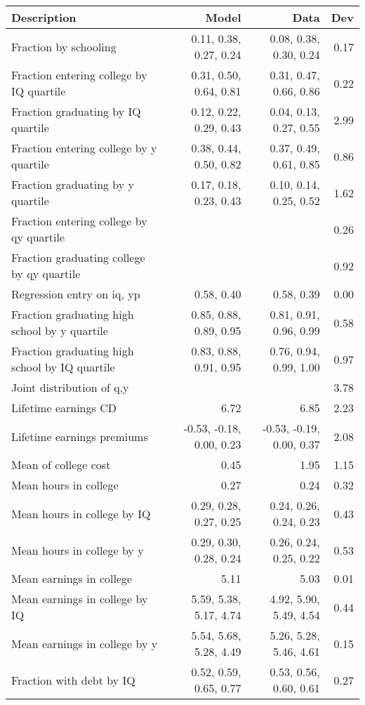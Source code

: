 \begin{tabular}{lrrr}
\hline
Description & Model  & Data  & Dev  \\ 
\hline
Fraction by schooling & 0.11, 0.38, 0.27, 0.24  & 0.08, 0.38, 0.30, 0.24  & 0.17  \\ 
Fraction entering college by IQ quartile & 0.31, 0.50, 0.64, 0.81  & 0.31, 0.47, 0.66, 0.86  & 0.22  \\ 
Fraction graduating by IQ quartile & 0.12, 0.22, 0.29, 0.43  & 0.04, 0.13, 0.27, 0.55  & 2.99  \\ 
Fraction entering college by y quartile & 0.38, 0.44, 0.50, 0.82  & 0.37, 0.49, 0.61, 0.85  & 0.86  \\ 
Fraction graduating by y quartile & 0.17, 0.18, 0.23, 0.43  & 0.10, 0.14, 0.25, 0.52  & 1.62  \\ 
Fraction entering college by qy quartile &   &   & 0.26  \\ 
Fraction graduating college by qy quartile &   &   & 0.92  \\ 
Regression entry on iq, yp & 0.58, 0.40  & 0.58, 0.39  & 0.00  \\ 
Fraction graduating high school by y quartile & 0.85, 0.88, 0.89, 0.95  & 0.81, 0.91, 0.96, 0.99  & 0.58  \\ 
Fraction graduating high school by IQ quartile & 0.83, 0.88, 0.91, 0.95  & 0.76, 0.94, 0.99, 1.00  & 0.97  \\ 
Joint distribution of q,y &   &   & 3.78  \\ 
Lifetime earnings CD & 6.72  & 6.85  & 2.23  \\ 
Lifetime earnings premiums & -0.53, -0.18, 0.00, 0.23  & -0.53, -0.19, 0.00, 0.37  & 2.08  \\ 
Mean of college cost & 0.45  & 1.95  & 1.15  \\ 
Mean hours in college & 0.27  & 0.24  & 0.32  \\ 
Mean hours in college by IQ & 0.29, 0.28, 0.27, 0.25  & 0.24, 0.26, 0.24, 0.23  & 0.43  \\ 
Mean hours in college by y & 0.29, 0.30, 0.28, 0.24  & 0.26, 0.24, 0.25, 0.22  & 0.53  \\ 
Mean earnings in college & 5.11  & 5.03  & 0.01  \\ 
Mean earnings in college by IQ & 5.59, 5.38, 5.17, 4.74  & 4.92, 5.90, 5.49, 4.54  & 0.44  \\ 
Mean earnings in college by y & 5.54, 5.68, 5.28, 4.49  & 5.26, 5.28, 5.46, 4.61  & 0.15  \\ 
Fraction with debt by IQ & 0.52, 0.59, 0.65, 0.77  & 0.53, 0.56, 0.60, 0.61  & 0.27  \\ 

\end{tabular}
